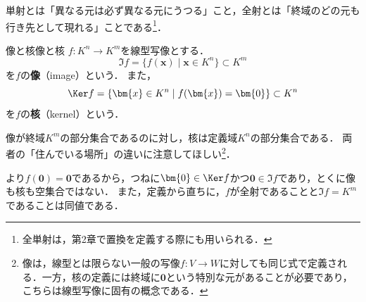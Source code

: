 単射とは「異なる元は必ず異なる元にうつる」こと，全射とは「終域のどの元も行き先として現れる」ことである\footnote{全単射は，第2章で置換を定義する際にも用いられる．}．

\begin{definition}{像と核}{像と核}
  $f \colon K^n \to K^m$を線型写像とする．
  \[
    \Im f = \{ f(\bm{x}) \mid \bm{x} \in K^n \} \subset K^m
  \]
  を$f$の\textbf{像}（image）という．
  また，
  \[
    \Ker f = \{ \bm{x} \in K^n \mid f(\bm{x}) = \bm{0} \} \subset K^n
  \]
  を$f$の\textbf{核}（kernel）という．
\end{definition}

像が終域$K^m$の部分集合であるのに対し，核は定義域$K^n$の部分集合である．
両者の「住んでいる場所」の違いに注意してほしい\footnote{像は，線型とは限らない一般の写像$f \colon V \to W$に対しても同じ式で定義される．一方，核の定義には終域に$\bm{0}$という特別な元があることが必要であり，こちらは線型写像に固有の概念である．}．

より$f(\bm{0}) = \bm{0}$であるから，つねに$\bm{0} \in \Ker f$かつ$\bm{0} \in \Im f$であり，とくに像も核も空集合ではない．
また，定義から直ちに，$f$が全射であることと$\Im f = K^m$であることは同値である．

